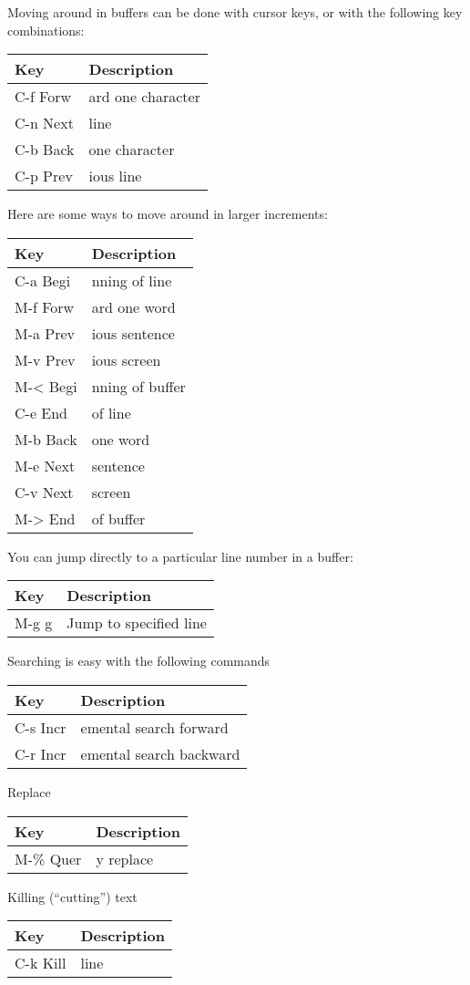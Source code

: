 Moving around in buffers can be done with cursor keys, or with the
following key combinations:

\begin{longtable}[]{@{}ll@{}}
\toprule
Key & Description\tabularnewline
\midrule
\endhead
C-f Forw & ard one character\tabularnewline
C-n Next & line\tabularnewline
C-b Back & one character\tabularnewline
C-p Prev & ious line\tabularnewline
\bottomrule
\end{longtable}

Here are some ways to move around in larger increments:

\begin{longtable}[]{@{}ll@{}}
\toprule
Key & Description\tabularnewline
\midrule
\endhead
C-a Begi & nning of line\tabularnewline
M-f Forw & ard one word\tabularnewline
M-a Prev & ious sentence\tabularnewline
M-v Prev & ious screen\tabularnewline
M-\textless{} Begi & nning of buffer\tabularnewline
C-e End & of line\tabularnewline
M-b Back & one word\tabularnewline
M-e Next & sentence\tabularnewline
C-v Next & screen\tabularnewline
M-\textgreater{} End & of buffer\tabularnewline
\bottomrule
\end{longtable}

You can jump directly to a particular line number in a buffer:

\begin{longtable}[]{@{}ll@{}}
\toprule
Key & Description\tabularnewline
\midrule
\endhead
M-g g & Jump to specified line\tabularnewline
\bottomrule
\end{longtable}

Searching is easy with the following commands

\begin{longtable}[]{@{}ll@{}}
\toprule
Key & Description\tabularnewline
\midrule
\endhead
C-s Incr & emental search forward\tabularnewline
C-r Incr & emental search backward\tabularnewline
\bottomrule
\end{longtable}

Replace

\begin{longtable}[]{@{}ll@{}}
\toprule
Key & Description\tabularnewline
\midrule
\endhead
M-\% Quer & y replace\tabularnewline
\bottomrule
\end{longtable}

Killing (``cutting'') text

\begin{longtable}[]{@{}ll@{}}
\toprule
Key & Description\tabularnewline
\midrule
\endhead
C-k Kill & line\tabularnewline
\bottomrule
\end{longtable}

